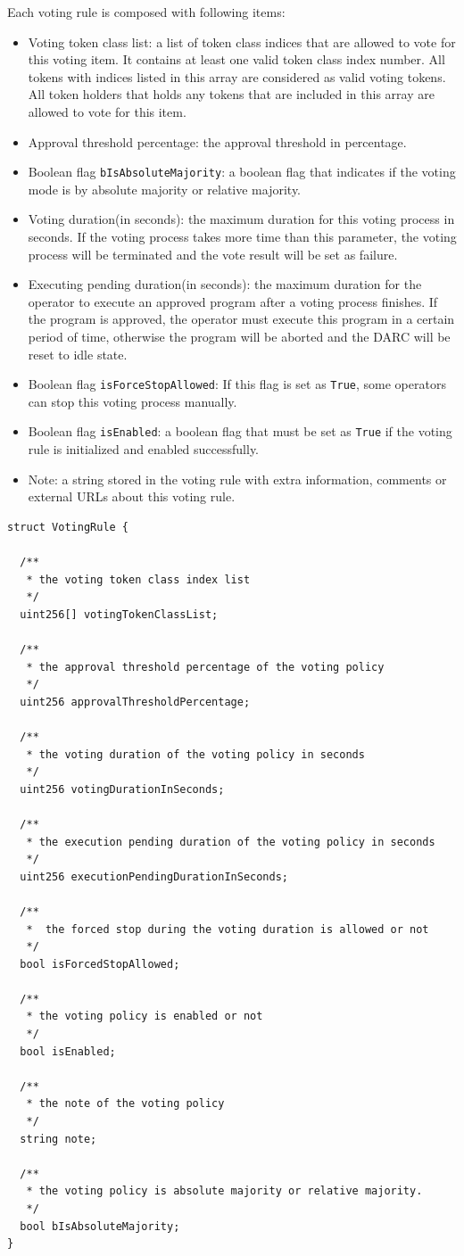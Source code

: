 \documentclass[main.tex]{subfiles}
\begin{document}
Each voting rule is composed with following items:
\begin{itemize}
    \item Voting token class list: a list of token class indices that are allowed to vote for this voting item. It contains at least one valid token class index number. All tokens with indices listed in this array are considered as valid voting tokens. All token holders that holds any tokens that are included in this array are allowed to vote for this item.
    \item Approval threshold percentage: the approval threshold in percentage. 
    \item Boolean flag \texttt{bIsAbsoluteMajority}: a boolean flag that indicates if the voting mode is by absolute majority or relative majority.
    \item Voting duration(in seconds): the maximum duration for this voting process in seconds. If the voting process takes more time than this parameter, the voting process will be terminated and the vote result will be set as failure.
    \item Executing pending duration(in seconds): the maximum duration for the operator to execute an approved program after a voting process finishes. If the program is approved, the operator must execute this program in a certain period of time, otherwise the program will be aborted and the DARC will be reset to idle state.
    \item Boolean flag \texttt{isForceStopAllowed}: If this flag is set as \texttt{True}, some operators can stop this voting process manually.
    \item Boolean flag \texttt{isEnabled}: a boolean flag that must be set as \texttt{True} if the voting rule is initialized and enabled successfully.
    \item Note: a string stored in the voting rule with extra information, comments or external URLs about this voting rule.
\end{itemize}

\begin{verbatim}
struct VotingRule {

  /**
   * the voting token class index list
   */
  uint256[] votingTokenClassList;

  /**
   * the approval threshold percentage of the voting policy
   */
  uint256 approvalThresholdPercentage;

  /**
   * the voting duration of the voting policy in seconds
   */
  uint256 votingDurationInSeconds;

  /**
   * the execution pending duration of the voting policy in seconds
   */
  uint256 executionPendingDurationInSeconds;

  /**
   *  the forced stop during the voting duration is allowed or not
   */
  bool isForcedStopAllowed;

  /**
   * the voting policy is enabled or not
   */
  bool isEnabled;

  /**
   * the note of the voting policy
   */
  string note;

  /**
   * the voting policy is absolute majority or relative majority.
   */
  bool bIsAbsoluteMajority;
}
\end{verbatim}
\end{document}
